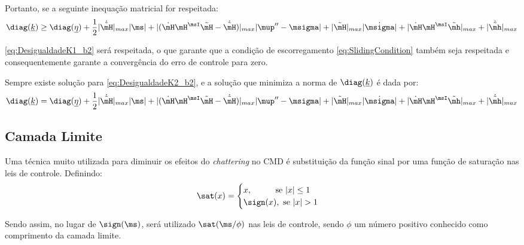 \documentclass[]{politex}
\begin{document}
\begin{itemize}
\begin{itemize}
Portanto, se a seguinte inequa\c{c}\~ao matricial for respeitada:
\begin{equation} \label{eq:DesigualdadeK2_b2}
\diag(\underline{k})  \geq \diag(\underline{\eta}) + \frac{1}{2}|\dot{\tilde{\mH}}|_{max} |\ms| + |( \dot{\mH} \mH^\msI \tilde{\mH} -\dot{\tilde{\mH}})|_{max} 	|\mup'' - \msigma | + |\tilde{\mH}|_{max} |\dot{\msigma}| + |\dot{\mH} \mH^\msI \tilde{\mh}|_{max} + |\dot{\tilde{\mh}}|_{max}
\end{equation}

\eqref{eq:DesigualdadeK1_b2} ser\'a respeitada, o que garante que a condi\c{c}\~ao de escorregamento \eqref{eq:SlidingCondition} tamb\'em seja respeitada e consequentemente garante a converg\^encia do erro de controle para zero.

Sempre existe solu\c{c}\~ao para \eqref{eq:DesigualdadeK2_b2}, e a solução que minimiza a norma de $\diag(\underline{k})$ é dada por:
\begin{equation} \label{eq:MatrizDiagk_b2}
\diag(\underline{k})  = \diag(\underline{\eta}) + \frac{1}{2}|\dot{\tilde{\mH}}|_{max} |\ms| + |( \dot{\mH} \mH^\msI \tilde{\mH} -\dot{\tilde{\mH}})|_{max} 	|\mup'' - \msigma | + |\tilde{\mH}|_{max} |\dot{\msigma}| + |\dot{\mH} \mH^\msI \tilde{\mh}|_{max} + |\dot{\tilde{\mh}}|_{max}
\end{equation}

\end{itemize}



\end{itemize}

\subsection{Camada Limite}

Uma técnica muito utilizada para diminuir os efeitos do \emph{chattering} no CMD é substituição da função sinal por uma função de saturação nas leis de controle. Definindo:
\begin{equation}
\sat(x) = \begin{cases}
x, \;\;\;\;\;\;\;\;\; \text{ se } |x| \leq 1 \\
\sign(x), \text{ se } |x| > 1
\end{cases}
\end{equation}

Sendo assim, no lugar de $\sign(\ms)$, será utilizado $\sat(\ms / \phi)$ nas leis de controle, sendo $\phi$ um número positivo conhecido como comprimento da camada limite.
\end{document}
